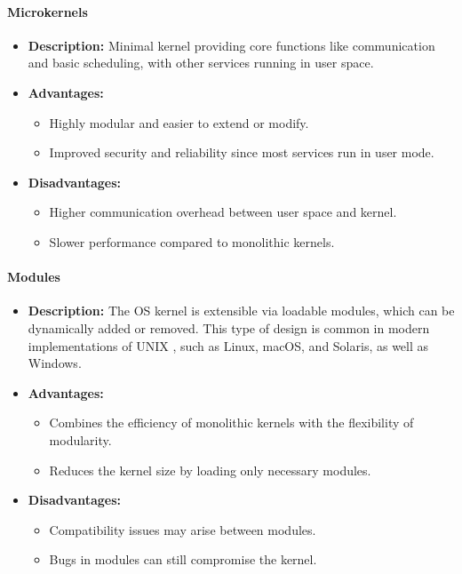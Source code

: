 \paragraph{Microkernels}
\begin{itemize}
    \item \textbf{Description:} Minimal kernel providing core functions like communication and basic scheduling, with other services running in user space.
    \item \textbf{Advantages:}
    \begin{itemize}
        \item Highly modular and easier to extend or modify.
        \item Improved security and reliability since most services run in user mode.
    \end{itemize}
    \item \textbf{Disadvantages:}
    \begin{itemize}
        \item Higher communication overhead between user space and kernel.
        \item Slower performance compared to monolithic kernels.
    \end{itemize}
\end{itemize}

\paragraph{Modules}
\begin{itemize}
    \item \textbf{Description:} The OS kernel is extensible via loadable modules, which can be dynamically added or removed. This type of design is common in modern implementations
    of UNIX , such as Linux, macOS, and Solaris, as well as Windows. 
    \item \textbf{Advantages:}
    \begin{itemize}
        \item Combines the efficiency of monolithic kernels with the flexibility of modularity.
        \item Reduces the kernel size by loading only necessary modules.
    \end{itemize}
    \item \textbf{Disadvantages:}
    \begin{itemize}
        \item Compatibility issues may arise between modules.
        \item Bugs in modules can still compromise the kernel.
    \end{itemize}
\end{itemize}

